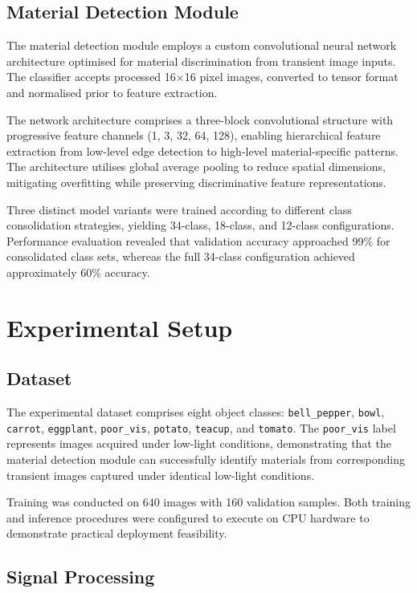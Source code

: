 \documentclass[10pt,twocolumn]{article}
\begin{document}
\subsection{Material Detection Module}

The material detection module employs a custom convolutional neural network architecture optimised for material discrimination from transient image inputs. The classifier accepts processed 16$\times$16 pixel images, converted to tensor format and normalised prior to feature extraction.

The network architecture comprises a three-block convolutional structure with progressive feature channels (1, 3, 32, 64, 128), enabling hierarchical feature extraction from low-level edge detection to high-level material-specific patterns. The architecture utilises global average pooling to reduce spatial dimensions, mitigating overfitting while preserving discriminative feature representations.

Three distinct model variants were trained according to different class consolidation strategies, yielding 34-class, 18-class, and 12-class configurations. Performance evaluation revealed that validation accuracy approached 99\% for consolidated class sets, whereas the full 34-class configuration achieved approximately 60\% accuracy.

\section{Experimental Setup}

\subsection{Dataset}

The experimental dataset comprises eight object classes: \texttt{bell\_pepper}, \texttt{bowl}, \texttt{carrot}, \texttt{eggplant}, \texttt{poor\_vis}, \texttt{potato}, \texttt{teacup}, and \texttt{tomato}. The \texttt{poor\_vis} label represents images acquired under low-light conditions, demonstrating that the material detection module can successfully identify materials from corresponding transient images captured under identical low-light conditions.

Training was conducted on 640 images with 160 validation samples. Both training and inference procedures were configured to execute on CPU hardware to demonstrate practical deployment feasibility.

\subsection{Signal Processing}
\end{document}
